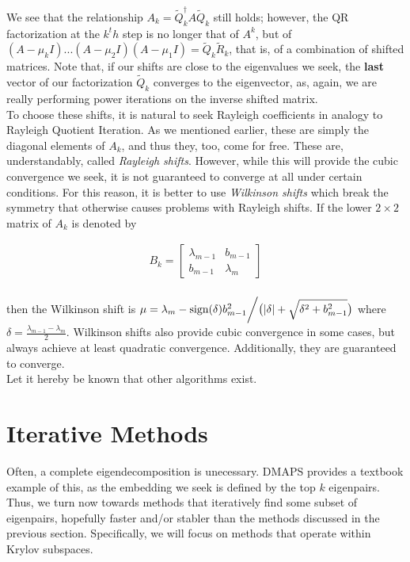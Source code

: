 \documentclass[11pt]{article}
\begin{document}
We see that the relationship $A_k = \tilde{Q}_k^\dagger A \tilde{Q}_k$ still holds; however, the QR factorization at the $k^th$ step is no longer that of $A^k$, but of $(A-\mu_k I)...(A-\mu_2I)(A-\mu_1I) = \tilde{Q}_k \tilde{R}_k$, that is, of a combination of shifted matrices. Note that, if our shifts are close to the eigenvalues we seek, the \textbf{last} vector of our factorization $\tilde{Q}_k$ converges to the eigenvector, as, again, we are really performing power iterations on the inverse shifted matrix. \\

To choose these shifts, it is natural to seek Rayleigh coefficients in analogy to Rayleigh Quotient Iteration. As we mentioned earlier, these are simply the diagonal elements of $A_k$, and thus they, too, come for free. These are, understandably, called \textit{Rayleigh shifts}. However, while this will provide the cubic convergence we seek, it is not guaranteed to converge at all under certain conditions. For this reason, it is better to use \textit{Wilkinson shifts} which break the symmetry that otherwise causes problems with Rayleigh shifts. If the lower $2\times2$ matrix of $A_k$ is denoted by

\begin{align*}
  B_k = \begin{bmatrix} \lambda_{m-1} & b_{m-1} \\ b_{m-1} & \lambda_m \end{bmatrix} \\
\end{align*}

then the Wilkinson shift is $\mu = \lambda_m - \textrm{sign}(\delta)b_{m-1}^2 \bigg{/} \big{(}|\delta| + \sqrt{\delta^2 + b_{m-1}^2}\big{)}$ where $\delta = \frac{\lambda_{m-1} - \lambda_m}{2}$. Wilkinson shifts also provide cubic convergence in some cases, but always achieve at least quadratic convergence. Additionally, they are guaranteed to converge. \\

Let it hereby be known that other algorithms exist.

\section{Iterative Methods}

Often, a complete eigendecomposition is unecessary. DMAPS provides a textbook example of this, as the embedding we seek is defined by the top $k$ eigenpairs. Thus, we turn now towards methods that iteratively find some subset of eigenpairs, hopefully faster and/or stabler than the methods discussed in the previous section. Specifically, we will focus on methods that operate within Krylov subspaces.
\end{document}
